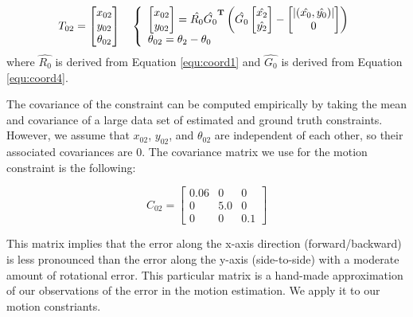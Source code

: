 \begin{equation}
T_{02} = 
\begin{bmatrix}
x_{02} \\
y_{02} \\
\theta_{02}
\end{bmatrix}
\quad
\left\{ 
  \begin{array}{l l}
\begin{bmatrix}
x_{02} \\
y_{02} \\
\end{bmatrix}
 = \hat{R_0}
{\hat{G_0}}^{\mathbf{T}} \left(\hat{G_0}
\begin{bmatrix}
\hat{x_2} \\
\hat{y_2}
\end{bmatrix}
-
\begin{bmatrix}
|(\hat{x_0},\hat{y_0})|\\
0
\end{bmatrix}
\right) \\
  \theta_{02} = \theta_2 - \theta_0
  \end{array} \right.
\end{equation}
where $\hat{R_0}$ is derived from Equation \ref{equ:coord1} and $\hat{G_0}$ is derived from Equation \ref{equ:coord4}.



The covariance of the constraint can be computed empirically by taking the mean and covariance of a large data set of estimated and ground truth constraints.  However, we assume that $x_{02}$, $y_{02}$, and $\theta_{02}$ are independent of each other, so their associated covariances are 0.  The covariance matrix we use for the motion constraint is the following:

\begin{equation}
C_{02} = 
\begin{bmatrix}
0.06 & 0 & 0 \\
0 & 5.0 & 0 \\
0 & 0 & 0.1 
\end{bmatrix}
\end{equation}

This matrix implies that the error along the x-axis direction (forward/backward) is less pronounced than the error along the y-axis (side-to-side) with a moderate amount of rotational error.  This particular matrix is a hand-made approximation of our observations of the error in the motion estimation.  We apply it to our motion constriants.

